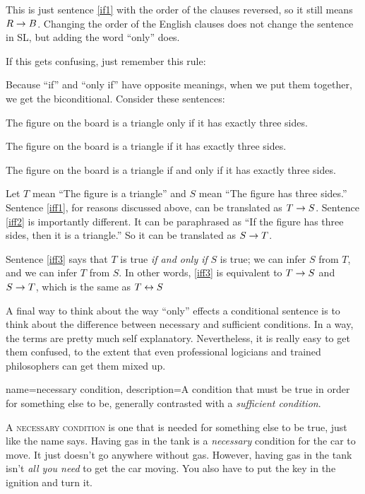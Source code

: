 This is just sentence \ref{if1} with the order of the clauses reversed, so it still means $R \rightarrow B$. Changing the order of the English clauses does not change the sentence in SL, but adding the word ``only'' does.

If this gets confusing, just remember this rule:


Because ``if'' and ``only if'' have opposite meanings, when we put them together, we get the biconditional. Consider these sentences:
\begin{earg}
\item[\ex{iff1}] The figure on the board is a triangle only if it has exactly three sides.
\item[\ex{iff2}] The figure on the board is a triangle if it has exactly three sides.
\item[\ex{iff3}] The figure on the board is a triangle if and only if it has exactly three sides.
\end{earg}

Let $T$ mean ``The figure is a triangle'' and $S$ mean ``The figure has three sides.'' Sentence \ref{iff1}, for reasons discussed above, can be translated as $T\rightarrow S$. Sentence \ref{iff2} is importantly different. It can be paraphrased as ``If the figure has three sides, then it is a triangle.'' So it can be translated as $S\rightarrow T$.

Sentence \ref{iff3} says that $T$ is true \emph{if and only if} $S$ is true; we can infer $S$ from $T$, and we can infer $T$ from $S$.  In other words, \ref{iff3} is equivalent to $T\rightarrow S$ and $S\rightarrow T$, which is the same as $T \leftrightarrow S$

A final way to think about the way ``only'' effects a conditional sentence is to think about the  difference between necessary and sufficient conditions. In a way, the terms are pretty much self explanatory. Nevertheless, it is really easy to get them confused, to the extent that even professional logicians and trained philosophers can get them mixed up.


{
name=necessary condition,
description={A condition that must be true in order for something else to be, generally contrasted with a \textit{sufficient condition}.}
}

A \textsc{\gls{necessary condition}}\label{def:necessary_condition} is one that is needed for something else to be true, just like the name says. Having gas in the tank is a \textit{necessary} condition for the car to move. It just doesn't go anywhere without gas. However, having gas in the tank isn't \textit{all you need} to get the car moving. You also have to put the key in the  ignition and turn it.

